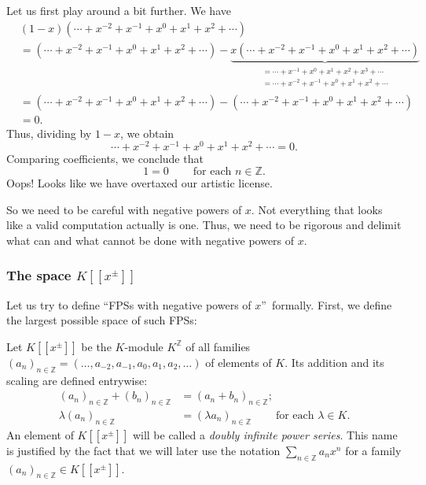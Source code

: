 Let us first play around a bit further. We have%
\begin{align*}
&  \left(  1-x\right)  \left(  \cdots+x^{-2}+x^{-1}+x^{0}+x^{1}+x^{2}%
+\cdots\right) \\
&  =\left(  \cdots+x^{-2}+x^{-1}+x^{0}+x^{1}+x^{2}+\cdots\right)
-\underbrace{x\left(  \cdots+x^{-2}+x^{-1}+x^{0}+x^{1}+x^{2}+\cdots\right)
}_{\substack{=\cdots+x^{-1}+x^{0}+x^{1}+x^{2}+x^{3}+\cdots\\=\cdots
+x^{-2}+x^{-1}+x^{0}+x^{1}+x^{2}+\cdots}}\\
&  =\left(  \cdots+x^{-2}+x^{-1}+x^{0}+x^{1}+x^{2}+\cdots\right)  -\left(
\cdots+x^{-2}+x^{-1}+x^{0}+x^{1}+x^{2}+\cdots\right) \\
&  =0.
\end{align*}
Thus, dividing by $1-x$, we obtain%
\[
\cdots+x^{-2}+x^{-1}+x^{0}+x^{1}+x^{2}+\cdots=0.
\]
Comparing coefficients, we conclude that%
\[
1=0\ \ \ \ \ \ \ \ \ \ \text{for each }n\in\mathbb{Z}.
\]
Oops! Looks like we have overtaxed our artistic license.

So we need to be careful with negative powers of $x$. Not everything that
looks like a valid computation actually is one. Thus, we need to be rigorous
and delimit what can and what cannot be done with negative powers of $x$.

\subsubsection{The space $K\left[  \left[  x^{\pm}\right]  \right]  $}

Let us try to define \textquotedblleft FPSs with negative powers of
$x$\textquotedblright\ formally. First, we define the largest possible space
of such FPSs:

\begin{definition}
\label{def.fps.laure.double}Let $K\left[  \left[  x^{\pm}\right]  \right]  $
be the $K$-module $K^{\mathbb{Z}}$ of all families $\left(  a_{n}\right)
_{n\in\mathbb{Z}}=\left(  \ldots,a_{-2},a_{-1},a_{0},a_{1},a_{2}%
,\ldots\right)  $ of elements of $K$. Its addition and its scaling are defined
entrywise:%
\begin{align*}
\left(  a_{n}\right)  _{n\in\mathbb{Z}}+\left(  b_{n}\right)  _{n\in
\mathbb{Z}}  &  =\left(  a_{n}+b_{n}\right)  _{n\in\mathbb{Z}};\\
\lambda\left(  a_{n}\right)  _{n\in\mathbb{Z}}  &  =\left(  \lambda
a_{n}\right)  _{n\in\mathbb{Z}}\ \ \ \ \ \ \ \ \ \ \text{for each }\lambda\in
K.
\end{align*}
An element of $K\left[  \left[  x^{\pm}\right]  \right]  $ will be called a
\emph{doubly infinite power series}. This name is justified by the fact that
we will later use the notation $\sum_{n\in\mathbb{Z}}a_{n}x^{n}$ for a family
$\left(  a_{n}\right)  _{n\in\mathbb{Z}}\in K\left[  \left[  x^{\pm}\right]
\right]  $.
\end{definition}

